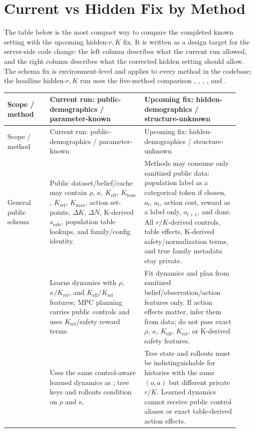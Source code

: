 \documentclass[11pt]{article}
\newcommand{\code}[1]{\texttt{\detokenize{#1}}}
\newcommand{\rhoctl}{\rho}
\newcommand{\kappactl}{\kappa}
\newcommand{\Kbase}{K_{\mathrm{base}}}
\newcommand{\Keff}{K_{\mathrm{eff}}}
\newcommand{\Kref}{K_{\mathrm{ref}}}
\newcommand{\Kmax}{K_{\max}}
\newcommand{\ssafe}{s_{\mathrm{safe}}}
\begin{document}
\section{Current vs Hidden Fix by Method}

The table below is the most compact way to compare the completed known setting
with the upcoming hidden-\(r,K\) fix. It is written as a design target for the
server-side code change: the left column describes what the current run allowed,
and the right column describes what the corrected hidden setting should allow.
The schema fix is environment-level and applies to every method in the codebase;
the headline hidden-\(r,K\) run uses the five-method comparison
\code{refplan}, \code{bamcts}, \code{ogsrl}, \code{moor_native}, and
\code{plus_native}.

\begin{longtable}{p{0.17\linewidth}p{0.38\linewidth}p{0.38\linewidth}}
\toprule
Scope / method & Current run: public-demographics / parameter-known & Upcoming fix: hidden-demographics / structure-unknown \\
\midrule
\endfirsthead
\toprule
Scope / method & Current run: public-demographics / parameter-known & Upcoming fix: hidden-demographics / structure-unknown \\
\midrule
\endhead
General public schema &
Public dataset/belief/cache may contain \(\rhoctl\), \(\kappactl\), \(\Keff\),
\(\Kbase\), \(\Kref\), \(\Kmax\), action set-points, \(\Delta K\), \(\Delta N\),
K-derived \(\ssafe\), population table lookups, and family/config identity. &
Methods may consume only sanitized public data: population label as a categorical
token if chosen, \(o_t\), \(a_t\), action cost, reward as a label only,
\(o_{t+1}\), and done. All \(r/K\)-derived controls, table effects, K-derived
safety/normalization terms, and true family metadata stay private. \\

\code{refplan} &
Learns dynamics with \(\rhoctl\), \(\kappactl/\Kref\), and \(\Keff/\Kref\)
features; MPC planning carries public controls and uses \(\Kref\)/safety reward
terms. &
Fit dynamics and plan from sanitized belief/observation/action features only.
If action effects matter, infer them from data; do not pass exact \(\rhoctl\),
\(\kappactl\), \(\Keff\), \(\Kref\), or K-derived safety features. \\

\code{bamcts} &
Uses the same control-aware learned dynamics as \code{refplan}; tree keys and
rollouts condition on \(\rhoctl\) and \(\kappactl\). &
Tree state and rollouts must be indistinguishable for histories with the same
\((o,a)\) but different private \(r/K\). Learned dynamics cannot receive public
control aliases or exact table-derived action effects. \\


\end{longtable}
\end{document}
